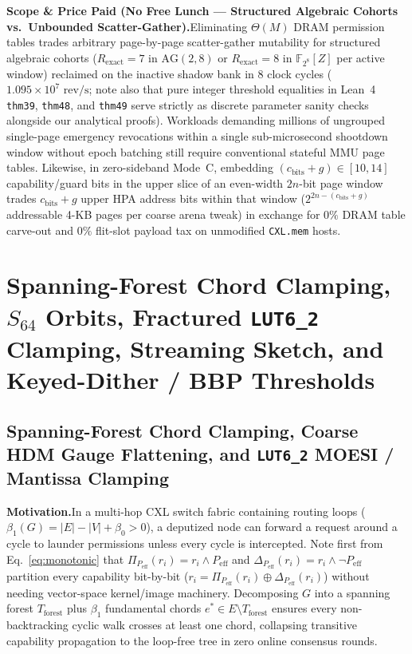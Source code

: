 \documentclass[11pt,letterpaper]{article}
\theoremstyle{spectralthm}
\begin{document}
\noindent\textbf{Scope \& Price Paid (No Free Lunch --- Structured Algebraic Cohorts vs.\ Unbounded Scatter-Gather).}\;Eliminating $\Theta(M)$ DRAM permission tables trades arbitrary page-by-page scatter-gather mutability for structured algebraic cohorts ($R_{\mathrm{exact}}=7$ in $\mathrm{AG}(2,8)$ or $R_{\mathrm{exact}}=8$ in $\mathbb{F}_{2^8}[Z]$ per active window) reclaimed on the inactive shadow bank in 8 clock cycles ($1.095 \times 10^7\text{~rev/s}$; note also that pure integer threshold equalities in Lean~4 \texttt{thm39}, \texttt{thm48}, and \texttt{thm49} serve strictly as discrete parameter sanity checks alongside our analytical proofs). Workloads demanding millions of ungrouped single-page emergency revocations within a single sub-microsecond shootdown window without epoch batching still require conventional stateful MMU page tables. Likewise, in zero-sideband Mode~C, embedding $(c_{\mathrm{bits}}+g)\in[10,14]$ capability/guard bits in the upper slice of an even-width $2n$-bit page window trades $c_{\mathrm{bits}}+g$ upper HPA address bits within that window ($2^{2n-(c_{\mathrm{bits}}+g)}$ addressable 4-KB pages per coarse arena tweak) in exchange for $0\%$ DRAM table carve-out and $0\%$ flit-slot payload tax on unmodified \texttt{CXL.mem} hosts.

\section{Spanning-Forest Chord Clamping, \texorpdfstring{$S_{64}$}{S\_64} Orbits, Fractured \texorpdfstring{\texttt{LUT6\_2}}{LUT6\_2} Clamping, Streaming Sketch, and Keyed-Dither / BBP Thresholds}
\label{sec:forest}

\subsection{Spanning-Forest Chord Clamping, Coarse HDM Gauge Flattening, and \texorpdfstring{\texttt{LUT6\_2}}{LUT6\_2} MOESI / Mantissa Clamping}
\label{sec:sheaf_moesi}
\noindent\textbf{Motivation.}\;In a multi-hop CXL switch fabric containing routing loops ($\beta_1(G) = |E| - |V| + \beta_0 > 0$), a deputized node can forward a request around a cycle to launder permissions unless every cycle is intercepted. Note first from Eq.~\eqref{eq:monotonic} that $\Pi_{P_{\mathrm{eff}}}(r_i) = r_i \wedge P_{\mathrm{eff}}$ and $\Delta_{P_{\mathrm{eff}}}(r_i) = r_i \wedge \neg P_{\mathrm{eff}}$ partition every capability bit-by-bit ($r_i = \Pi_{P_{\mathrm{eff}}}(r_i) \oplus \Delta_{P_{\mathrm{eff}}}(r_i)$) without needing vector-space kernel/image machinery. Decomposing $G$ into a spanning forest $T_{\mathrm{forest}}$ plus $\beta_1$ fundamental chords $e^* \in E \setminus T_{\mathrm{forest}}$ ensures every non-backtracking cyclic walk crosses at least one chord, collapsing transitive capability propagation to the loop-free tree in zero online consensus rounds.\par\smallskip
\end{document}
